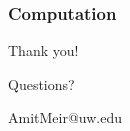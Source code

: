 \documentclass{beamer}
\theoremstyle{definition}
\begin{document}

\begin{frame}
\frametitle{Computation}

\end{frame}


\begin{frame}
\begin{center}
\huge{Thank you!}

\vspace{2 cm}
\LARGE{Questions?}

\vspace{1cm}
\large{AmitMeir@uw.edu}
\end{center}
\end{frame}
\end{document}
